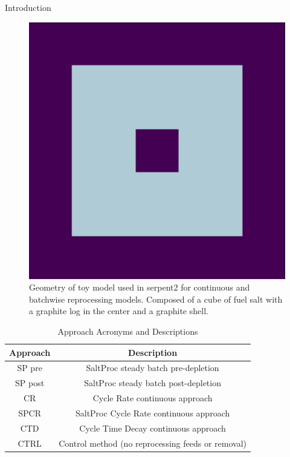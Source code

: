 \documentclass[final]{beamer}
\newlength{\onecolwid}
\newlength{\threecolwid}
\begin{document}
\begin{frame}[t]
\begin{columns}[t,totalwidth=\threecolwid]
\begin{column}{\onecolwid}
\begin{block}{Introduction}
\begin{figure}
	\label{fig:toy_geom}
	\includegraphics[width=0.6\linewidth]{images/CR0_geom1.png}
	\caption{Geometry of toy model used in serpent2 for continuous and batchwise reprocessing models. Composed of a cube of fuel salt with a graphite log in the center and a graphite shell.}
\end{figure}



\begin{table}[H]
\renewcommand{\arraystretch}{1.25}
\caption{Approach Acronyms and Descriptions}
\label{tab:res_key}
\begin{center}
\begin{tabular}{ | c | c | }
 \hline
        Approach & Description\\
 \hline
 \hline
 	SP pre & SaltProc steady batch pre-depletion\\
	SP post & SaltProc steady batch post-depletion\\
	CR & Cycle Rate continuous approach\\
	SPCR & SaltProc Cycle Rate continuous approach\\
	CTD & Cycle Time Decay continuous approach\\
	CTRL & Control method (no reprocessing feeds or removal)\\
 \hline
\end{tabular}
\end{center}
\end{table}

\end{block}



\end{column}
\end{columns}
\end{frame}
\end{document}
